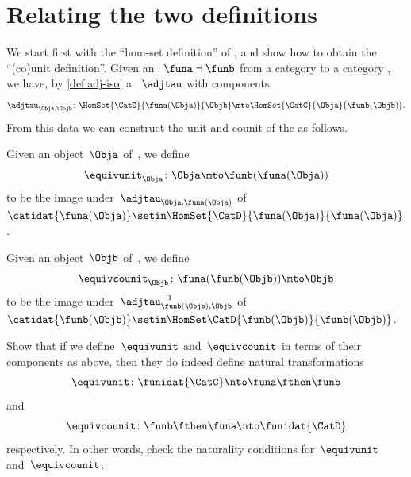 
\section{Relating the two definitions}
\label{relate-adj-defs}

We start first with the ``hom-set definition'' of , and show how to obtain the ``(co)unit definition''.
Given an ~$\funa \dashv \funb$ from a category \CatC to a category \CatD, we have, by \cref{def:adj-iso} a ~$\adjtau$ with components
\begin{equation}
    \adjtau_{\Obja,\Objb} \colon \HomSet{\CatD}{\funa(\Obja)}{\Objb} \mto \HomSet{\CatC}{\Obja}{\funb(\Objb)}.
\end{equation}
From this data we can construct the unit and counit of the  as follows.

Given an object~$\Obja$ of~\CatC, we define
%
\begin{equation}
    \equivunit_\Obja \colon \Obja \mto \funb(\funa(\Obja))
\end{equation}
%
to be the image under~$\adjtau_{\Obja, \funa(\Obja)}$ of~$\catidat{\funa(\Obja)} \setin \HomSet{\CatD}{\funa (\Obja)}{\funa(\Obja)}$.

Given an object~$\Objb$ of~\CatD, we define
\begin{equation}
    \equivcounit_\Objb \colon \funa(\funb(\Objb)) \mto \Objb
\end{equation}
to be the image under~$\adjtau_{\funb(\Objb), \Objb}^{-1}$ of~$\catidat{\funb(\Objb)} \setin \HomSet\CatD{\funb(\Objb)}{\funb(\Objb)}$.

\begin{exercise}
    \label{ex:eta-epsilon}

    Show that if we define~$\equivunit$ and~$\equivcounit$ in terms of their components as above, then they do indeed define natural transformations
    \begin{equation}
        \equivunit \colon \funidat{\CatC} \nto \funa \fthen \funb
    \end{equation}
    and
    \begin{equation}
        \equivcounit \colon \funb \fthen \funa \nto \funidat{\CatD}
    \end{equation}
    respectively.
    In other words, check the naturality conditions for~$\equivunit$ and~$\equivcounit$.
\end{exercise}

